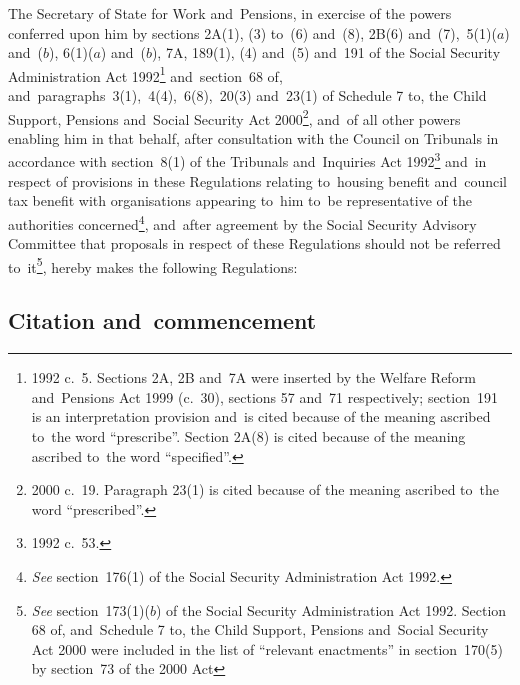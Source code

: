\documentclass[12pt,a4paper]{article}
\title{\regstitle}
\author{S.I.\ 2002 No.\ 1703}
\date{Made
3rd July 2002\\
Laid before Parliament
8th July 2002\\
Coming into~force
30th September 2002
}
\begin{document}
\maketitle

\begin{sloppypar}
\noindent
The Secretary of State for Work and~Pensions, in exercise of the powers conferred upon him by sections 2A(1), (3) to~(6) and~(8), 2B(6) and~(7),~5(1)($a$)  and~($b$), 6(1)($a$)  and~($b$), 7A, 189(1), (4) and~(5) and~191 of the Social Security Administration Act 1992\footnote{1992 c.~5. Sections 2A, 2B and~7A were inserted by the Welfare Reform and~Pensions Act 1999 (c.~30), sections 57 and~71 respectively; section~191 is an interpretation provision and~is cited because of the meaning ascribed to~the word “prescribe”. Section 2A(8) is cited because of the meaning ascribed to~the word “specified”.} and~section~68 of, and~paragraphs~3(1),~4(4),~6(8),~20(3) and~23(1) of Schedule 7 to, the Child Support, Pensions and~Social Security Act 2000\footnote{2000 c.~19. Paragraph 23(1) is cited because of the meaning ascribed to~the word “prescribed”.}, and~of all other powers enabling him in that behalf, after consultation with the Council on Tribunals in accordance with section~8(1) of the Tribunals and~Inquiries Act 1992\footnote{1992 c.~53.} and~in respect of provisions in these Regulations relating to~housing benefit and~council tax benefit with organisations appearing to~him to~be representative of the authorities concerned\footnote{\emph{See} section~176(1) of the Social Security Administration Act 1992.}, and~after agreement by the Social Security Advisory Committee that proposals in respect of these Regulations should not be referred to~it\footnote{\emph{See} section~173(1)($b$)  of the Social Security Administration Act 1992. Section 68 of, and~Schedule 7 to, the Child Support, Pensions and~Social Security Act 2000 were included in the list of “relevant enactments” in section~170(5) by section~73 of the 2000 Act}, hereby makes the following Regulations: 
\end{sloppypar}

{\sloppy

\tableofcontents

}

\bigskip

\setcounter{secnumdepth}{-2}

\subsection[1. Citation and~commencement]{Citation and~commencement}
\end{document}
